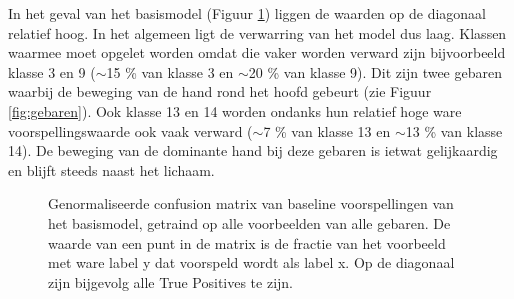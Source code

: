 \npar In het geval van het basismodel (Figuur \ref{fig:conf-allegebaren}) liggen de waarden op de diagonaal relatief hoog. In het algemeen ligt de verwarring van het model dus laag. Klassen waarmee moet opgelet worden omdat die vaker worden verward zijn bijvoorbeeld klasse 3 en 9 ($\sim$15 \% van klasse 3 en $\sim$20 \% van klasse 9). Dit zijn twee gebaren waarbij de beweging van de hand rond het hoofd gebeurt (zie Figuur \ref{fig:gebaren}). Ook klasse 13 en 14 worden ondanks hun relatief hoge ware voorspellingswaarde ook vaak verward ($\sim$7 \% van klasse 13 en $\sim$13 \% van klasse 14). De beweging van de dominante hand bij deze gebaren is ietwat gelijkaardig en blijft steeds naast het lichaam.

\begin{figure}
	\centering
	\def\svgwidth{0.8\columnwidth}
	
	\caption{Genormaliseerde confusion matrix van baseline voorspellingen van het basismodel, getraind op alle voorbeelden van alle gebaren. De waarde van een punt in de matrix is de fractie van het voorbeeld met ware label y dat voorspeld wordt als label x. Op de diagonaal zijn bijgevolg alle True Positives te zijn.}
	\label{fig:conf-allegebaren}
	

\end{figure}
